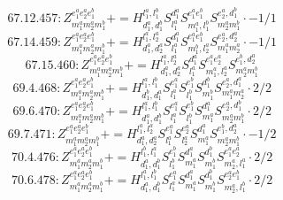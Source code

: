 \documentclass[letterpaper,10pt,fleqn,leqno,onecolumn]{article}
\begin{document}
\begin{equation} \;\;\;\;\;\;  67.12.457: Z^{e_{1}^{a}e_{2}^{a}e_{1}^{b}}_{m_{1}^{a}m_{2}^{a}m_{1}^{b}}+=H^{l_{1}^{a},l_{1}^{b}}_{d_{1}^{a},d_{1}^{b}}S^{d_{1}^{a}}_{l_{1}^{a}}S^{e_{1}^{a}e_{1}^{b}}_{m_{1}^{a},l_{1}^{b}}S^{e_{2}^{a},d_{1}^{b}}_{m_{2}^{a}m_{1}^{b}}\cdot -1/1 \end{equation}
\begin{equation} \;\;\;\;\;\;  67.14.459: Z^{e_{1}^{a}e_{2}^{a}e_{1}^{b}}_{m_{1}^{a}m_{2}^{a}m_{1}^{b}}+=H^{l_{1}^{a},l_{2}^{a}}_{d_{1}^{a},d_{2}^{a}}S^{d_{1}^{a}}_{l_{1}^{a}}S^{e_{1}^{a}e_{1}^{b}}_{m_{1}^{b},l_{2}^{a}}S^{e_{2}^{a},d_{2}^{a}}_{m_{1}^{a}m_{2}^{a}}\cdot -1/1 \end{equation}
\begin{equation} \;\;\;\;\;\;  67.15.460: Z^{e_{1}^{a}e_{2}^{a}e_{1}^{b}}_{m_{1}^{a}m_{2}^{a}m_{1}^{b}}+=H^{l_{1}^{a},l_{2}^{a}}_{d_{1}^{a},d_{2}^{a}}S^{d_{1}^{a}}_{l_{1}^{a}}S^{e_{1}^{a}e_{2}^{a}}_{m_{1}^{a},l_{2}^{a}}S^{e_{1}^{b},d_{2}^{a}}_{m_{2}^{a}m_{1}^{b}} \end{equation}
\begin{equation} \;\;\;\;\;\;  69.4.468: Z^{e_{1}^{a}e_{2}^{a}e_{1}^{b}}_{m_{1}^{a}m_{2}^{a}m_{1}^{b}}+=H^{l_{1}^{a},l_{1}^{b}}_{d_{1}^{b},d_{1}^{a}}S^{e_{1}^{a}}_{l_{1}^{a}}S^{e_{1}^{b}}_{l_{1}^{b}}S^{d_{1}^{b}}_{m_{1}^{b}}S^{e_{2}^{a},d_{1}^{a}}_{m_{1}^{a}m_{2}^{a}}\cdot 2/2 \end{equation}
\begin{equation} \;\;\;\;\;\;  69.6.470: Z^{e_{1}^{a}e_{2}^{a}e_{1}^{b}}_{m_{1}^{a}m_{2}^{a}m_{1}^{b}}+=H^{l_{1}^{a},l_{1}^{b}}_{d_{1}^{a},d_{1}^{b}}S^{e_{1}^{a}}_{l_{1}^{a}}S^{e_{1}^{b}}_{l_{1}^{b}}S^{d_{1}^{a}}_{m_{1}^{a}}S^{e_{2}^{a},d_{1}^{b}}_{m_{2}^{a}m_{1}^{b}}\cdot 2/2 \end{equation}
\begin{equation} \;\;\;\;\;\;  69.7.471: Z^{e_{1}^{a}e_{2}^{a}e_{1}^{b}}_{m_{1}^{a}m_{2}^{a}m_{1}^{b}}+=H^{l_{1}^{a},l_{2}^{a}}_{d_{1}^{a},d_{2}^{a}}S^{e_{1}^{a}}_{l_{1}^{a}}S^{e_{2}^{a}}_{l_{2}^{a}}S^{d_{1}^{a}}_{m_{1}^{a}}S^{e_{1}^{b},d_{2}^{a}}_{m_{2}^{a}m_{1}^{b}}\cdot -1/2 \end{equation}
\begin{equation} \;\;\;\;\;\;  70.4.476: Z^{e_{1}^{a}e_{2}^{a}e_{1}^{b}}_{m_{1}^{a}m_{2}^{a}m_{1}^{b}}+=H^{l_{1}^{b},l_{1}^{a}}_{d_{1}^{a},d_{1}^{b}}S^{e_{1}^{b}}_{l_{1}^{b}}S^{d_{1}^{a}}_{m_{1}^{a}}S^{d_{1}^{b}}_{m_{1}^{b}}S^{e_{1}^{a}e_{2}^{a}}_{m_{2}^{a},l_{1}^{a}}\cdot 2/2 \end{equation}
\begin{equation} \;\;\;\;\;\;  70.6.478: Z^{e_{1}^{a}e_{2}^{a}e_{1}^{b}}_{m_{1}^{a}m_{2}^{a}m_{1}^{b}}+=H^{l_{1}^{a},l_{1}^{b}}_{d_{1}^{a},d_{1}^{b}}S^{e_{1}^{a}}_{l_{1}^{a}}S^{d_{1}^{a}}_{m_{1}^{a}}S^{d_{1}^{b}}_{m_{1}^{b}}S^{e_{2}^{a}e_{1}^{b}}_{m_{2}^{a},l_{1}^{b}}\cdot 2/2 \end{equation}
\end{document}
